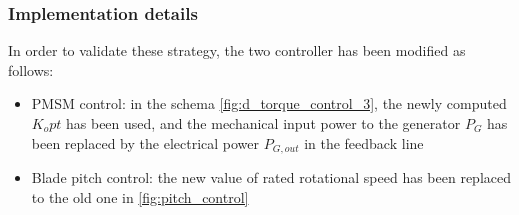 \subsubsection{Implementation details}
In order to validate these strategy, the two controller has been modified as follows:
\begin{itemize}
  \item PMSM control: in the schema \autoref{fig:d_torque_control_3}, the newly computed  $K_opt$ has been used, and the mechanical input power to the generator $P_G$ has been replaced by the electrical power $P_{G, out}$ in the feedback line
  \item Blade pitch control: the new value of rated rotational speed has been replaced to the old one in \autoref{fig:pitch_control}
\end{itemize}
